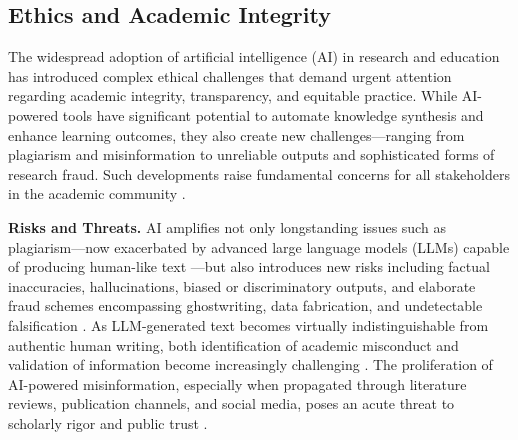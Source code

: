 \documentclass[sigconf]{acmart}
\begin{document}
\subsection{Ethics and Academic Integrity}

The widespread adoption of artificial intelligence (AI) in research and education has introduced complex ethical challenges that demand urgent attention regarding academic integrity, transparency, and equitable practice. While AI-powered tools have significant potential to automate knowledge synthesis and enhance learning outcomes, they also create new challenges—ranging from plagiarism and misinformation to unreliable outputs and sophisticated forms of research fraud. Such developments raise fundamental concerns for all stakeholders in the academic community \cite{ref2,ref4,ref7,ref9,ref10,ref13,ref14,ref15,ref23,ref24,ref39,ref40,ref41,ref45,ref51,ref53,ref64,ref65,ref66,ref70,ref76,ref80,ref81,ref82,ref83,ref84,ref85,ref89,ref90,ref91,ref92,ref93,ref94,ref95,ref96,ref97,ref98,ref109,ref110,ref73,ref86,ref100}.

\textbf{Risks and Threats.}
AI amplifies not only longstanding issues such as plagiarism—now exacerbated by advanced large language models (LLMs) capable of producing human-like text \cite{ref2,ref24,ref53,ref81,ref90,ref92,ref95,ref97}—but also introduces new risks including factual inaccuracies, hallucinations, biased or discriminatory outputs, and elaborate fraud schemes encompassing ghostwriting, data fabrication, and undetectable falsification \cite{ref4,ref9,ref14,ref39,ref40,ref45,ref66,ref70,ref76,ref80,ref84,ref86,ref91,ref93,ref109}. As LLM-generated text becomes virtually indistinguishable from authentic human writing, both identification of academic misconduct and validation of information become increasingly challenging \cite{ref14,ref24,ref80,ref85,ref92,ref97,ref110}. The proliferation of AI-powered misinformation, especially when propagated through literature reviews, publication channels, and social media, poses an acute threat to scholarly rigor and public trust \cite{ref15,ref39,ref41,ref64,ref85,ref98}.
\end{document}
